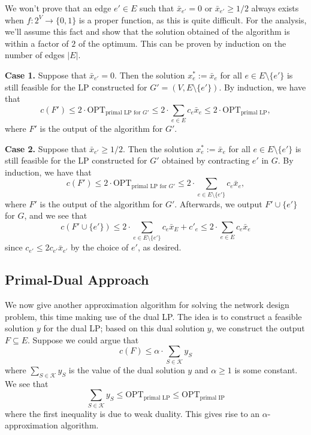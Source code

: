 We won't prove that an edge $e' \in E$ such that $\bar{x}_{e'} = 0$ 
or $\bar{x}_{e'} \geq 1/2$ always exists when $f : 2^V \to \{0, 1\}$ is a 
proper function, as this is quite difficult. For the analysis, we'll assume 
this fact and show that the solution obtained of the algorithm is within a 
factor of $2$ of the optimum. This can be proven by induction on the number 
of edges $|E|$. 

{\bf Case 1.} Suppose that $\bar{x}_{e'} = 0$. Then the solution 
$x^*_e := \bar{x}_e$ for all $e \in E \setminus \{e'\}$ is still feasible 
for the LP constructed for $G' = (V, E \setminus \{e'\})$. By 
induction, we have that 
\[ c(F') \leq 2 \cdot \text{OPT}_{\text{primal LP for $G'$}} \leq 
2 \cdot \sum_{e \in E} c_e \bar{x}_e \leq 2 \cdot \text{OPT}_{\text{primal LP}}, \] 
where $F'$ is the output of the algorithm for $G'$.

{\bf Case 2.} Suppose that $\bar{x}_{e'} \geq 1/2$. Then the solution 
$x_e^* := \bar{x}_e$ for all $e \in E \setminus \{e'\}$ is still feasible 
for the LP constructed for $G'$ obtained by contracting $e'$ in $G$. 
By induction, we have that 
\[ c(F') \leq 2 \cdot \text{OPT}_{\text{primal LP for $G'$}} \leq 
2 \cdot \sum_{e \in E \setminus \{e'\}} c_e \bar{x}_e, \]
where $F'$ is the output of the algorithm for $G'$. Afterwards, we output 
$F' \cup \{e'\}$ for $G$, and we see that 
\[ c(F' \cup \{e'\}) \leq 2 \cdot \sum_{e \in E \setminus \{e'\}} c_e \bar{x}_E
+ c'_e \leq 2 \cdot \sum_{e \in E} c_e \bar{x}_e \] 
since $c_{e'} \leq 2c_{e'} \bar{x}_{e'}$ by the choice of $e'$, as desired. 

\subsection{Primal-Dual Approach} \label{subsec:7.4}
We now give another approximation algorithm for solving the network 
design problem, this time making use of the dual LP. The idea is to 
construct a feasible solution $y$ for the dual LP; based on this 
dual solution $y$, we construct the output $F \subseteq E$. Suppose we 
could argue that 
\[ c(F) \leq \alpha \cdot \sum_{S \in \mathcal{K}} y_S \] 
where $\sum_{S \in \mathcal{K}} y_S$ is the value of the dual solution $y$ 
and $\alpha \geq 1$ is some constant. We see that 
\[ \sum_{S\in\mathcal{K}} y_S \leq \text{OPT}_{\text{primal LP}} \leq 
\text{OPT}_{\text{primal IP}} \] 
where the first inequality is due to weak duality. This gives rise to an
$\alpha$-approximation algorithm.

